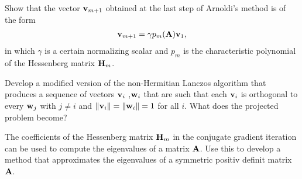 
\begin{Sheet}
  \label{sheet12}

  \begin{Problem}
    Show that the vector $\mathbf v_{m+1}$ obtained at the last step of
    Arnoldi's method is of the form
    \begin{gather*}
      \mathbf v_{m+1} = \gamma p_m(\mathbf A)\mathbf v_1,
    \end{gather*}
    in which $\gamma$ is a certain normalizing scalar and $p_m$ is the
    characteristic polynomial of the Hessenberg matrix $\mathbf H_m$.
  \end{Problem}

  \begin{Problem}
    Develop a modified version of the non-Hermitian Lanczos algorithm
    that produces a sequence of vectors $\mathbf v_i$ ,$\mathbf w_i$ that are such
    that each $\mathbf v_i$ is orthogonal to every $\mathbf w_j$ with $j\neq i$
    and $\lVert\mathbf v_i\rVert=\lVert\mathbf w_i\rVert=1$ for all $i$.  What does the
    projected problem become?
  \end{Problem}

  \begin{Problem}
    The coefficients of the Hessenberg matrix $\mathbf H_m$ in the
    conjugate gradient iteration can be used to compute the
    eigenvalues of a matrix $\mathbf A$.  Use this to develop a method
    that approximates the eigenvalues of a symmetric positiv definit
    matrix $\mathbf A$.
  \end{Problem}

  \vfill
  
  

\end{Sheet}


